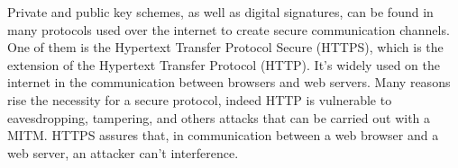 Private and public key schemes, as well as digital signatures, can be found in many protocols used over the internet to create secure communication channels. One of them is the Hypertext Transfer Protocol Secure (HTTPS), which is the extension of the Hypertext Transfer Protocol (HTTP). It's widely used on the internet in the communication between browsers and web servers. Many reasons rise the necessity for a secure protocol, indeed HTTP is vulnerable to eavesdropping, tampering, and others attacks that can be carried out with a MITM. HTTPS assures that, in communication between a web browser and a web server, an attacker can't interference.
